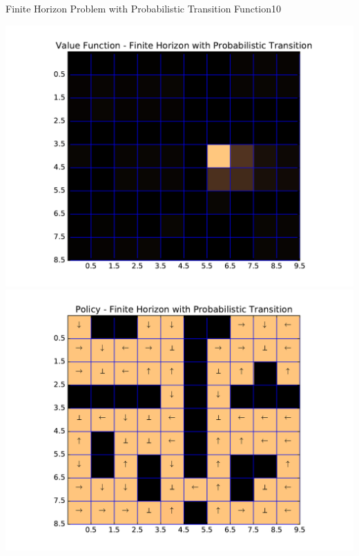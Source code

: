 \begin{questions}
\begin{question}{Finite Horizon Problem with Probabilistic Transition Function}{10}
\begin{answer}
\includegraphics[scale=0.4 ]{Gridworld/value_Fin_15_prob.pdf}
\includegraphics[scale=0.4 ]{Gridworld/policy_Fin_15_prob.pdf}


\end{answer}
\end{question}
\end{questions}
